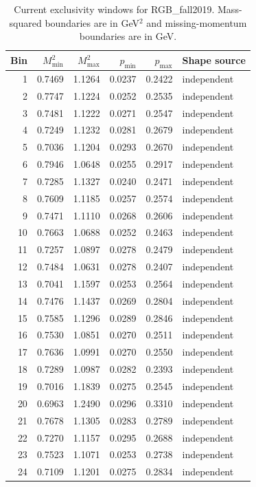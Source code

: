\clearpage
\begin{longtable}{rrrrrl}
\caption{Current exclusivity windows for RGB\_fall2019. Mass-squared boundaries are in GeV$^2$ and missing-momentum boundaries are in GeV.}\\
\toprule Bin & $M^2_{\min}$ & $M^2_{\max}$ & $p_{\min}$ & $p_{\max}$ & Shape source\\\midrule\endhead
1 & 0.7469 & 1.1264 & 0.0237 & 0.2422 & independent\\
2 & 0.7747 & 1.1224 & 0.0252 & 0.2535 & independent\\
3 & 0.7481 & 1.1222 & 0.0271 & 0.2547 & independent\\
4 & 0.7249 & 1.1232 & 0.0281 & 0.2679 & independent\\
5 & 0.7036 & 1.1204 & 0.0293 & 0.2670 & independent\\
6 & 0.7946 & 1.0648 & 0.0255 & 0.2917 & independent\\
7 & 0.7285 & 1.1327 & 0.0240 & 0.2471 & independent\\
8 & 0.7609 & 1.1185 & 0.0257 & 0.2574 & independent\\
9 & 0.7471 & 1.1110 & 0.0268 & 0.2606 & independent\\
10 & 0.7663 & 1.0688 & 0.0252 & 0.2463 & independent\\
11 & 0.7257 & 1.0897 & 0.0278 & 0.2479 & independent\\
12 & 0.7484 & 1.0631 & 0.0278 & 0.2407 & independent\\
13 & 0.7041 & 1.1597 & 0.0253 & 0.2564 & independent\\
14 & 0.7476 & 1.1437 & 0.0269 & 0.2804 & independent\\
15 & 0.7585 & 1.1296 & 0.0289 & 0.2846 & independent\\
16 & 0.7530 & 1.0851 & 0.0270 & 0.2511 & independent\\
17 & 0.7636 & 1.0991 & 0.0270 & 0.2550 & independent\\
18 & 0.7289 & 1.0987 & 0.0282 & 0.2393 & independent\\
19 & 0.7016 & 1.1839 & 0.0275 & 0.2545 & independent\\
20 & 0.6963 & 1.2490 & 0.0296 & 0.3310 & independent\\
21 & 0.7678 & 1.1305 & 0.0283 & 0.2789 & independent\\
22 & 0.7270 & 1.1157 & 0.0295 & 0.2688 & independent\\
23 & 0.7523 & 1.1071 & 0.0253 & 0.2738 & independent\\
24 & 0.7109 & 1.1201 & 0.0275 & 0.2834 & independent\\
\bottomrule\end{longtable}
